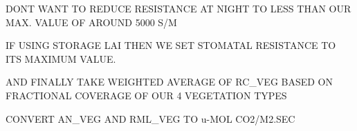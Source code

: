 D\+O\+N\textquotesingle{}T W\+A\+N\+T T\+O R\+E\+D\+U\+C\+E R\+E\+S\+I\+S\+T\+A\+N\+C\+E A\+T N\+I\+G\+H\+T T\+O L\+E\+S\+S T\+H\+A\+N O\+U\+R M\+A\+X. V\+A\+L\+U\+E O\+F A\+R\+O\+U\+N\+D 5000 S/\+M

I\+F U\+S\+I\+N\+G S\+T\+O\+R\+A\+G\+E L\+A\+I T\+H\+E\+N W\+E S\+E\+T S\+T\+O\+M\+A\+T\+A\+L R\+E\+S\+I\+S\+T\+A\+N\+C\+E T\+O I\+T\+S M\+A\+X\+I\+M\+U\+M V\+A\+L\+U\+E.

A\+N\+D F\+I\+N\+A\+L\+L\+Y T\+A\+K\+E W\+E\+I\+G\+H\+T\+E\+D A\+V\+E\+R\+A\+G\+E O\+F R\+C\+\_\+\+V\+E\+G B\+A\+S\+E\+D O\+N F\+R\+A\+C\+T\+I\+O\+N\+A\+L C\+O\+V\+E\+R\+A\+G\+E O\+F O\+U\+R 4 V\+E\+G\+E\+T\+A\+T\+I\+O\+N T\+Y\+P\+E\+S

C\+O\+N\+V\+E\+R\+T A\+N\+\_\+\+V\+E\+G A\+N\+D R\+M\+L\+\_\+\+V\+E\+G T\+O u-\/\+M\+O\+L C\+O2/\+M2.\+S\+E\+C
